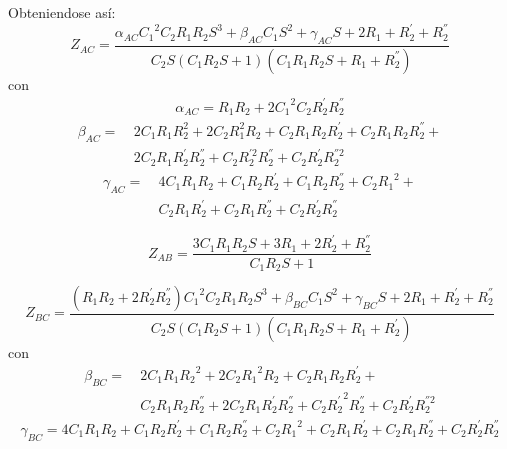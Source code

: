 \documentclass[a4paper]{article}
\begin{document}
Obteniendose así:
\begin{equation*}
	Z_{AC} =  \frac{\alpha_{AC} {C_{1}}^{2} C_2 R_{1} R_{2} S^{3} + \beta_{AC} C_1 S^{2}
		+ \gamma_{AC} S + 2 R_1 + R_{2}^{'} + R_{2}^{''}}{
		 C_2 S \left( C_1 R_{2} S + 1 \right)
		\left(C_1 R_1 R_{2} S + R_1 + R_{2}^{''}\right)}
\end{equation*}
con
\begin{equation*}
\begin{split}
	\alpha_{AC} = R_{1} R_{2} + 2 {C_{1}}^{2} C_2 R_{2}^{'} R_{2}^{''}
\end{split}
\end{equation*}
\begin{equation*}
\begin{split}
	\beta_{AC} =\ & 2 C_{1} R_1 R_{2}^{2} + 2 C_2 R_{1}^{2} R_{2} + C_2 R_1 R_{2} R_{2}^{'} +
		C_2 R_1 R_{2} R_{2}^{''} +\\
		&2 C_2 R_1 R_{2}^{'} R_{2}^{''} +
		C_2 R_{2}^{'2} R_{2}^{''} + C_2 R_{2}^{'} R_{2}^{''2}
\end{split}
\end{equation*}
\begin{equation*}
\begin{split}
	\gamma_{AC} =\ & 4 C_1 R_1 R_{2} + C_1 R_{2} R_{2}^{'} + C_1 R_{2} R_{2}^{''} +
		C_2 {R_{1}}^{2} +\\
		&C_2 R_1 R_{2}^{'} + C_2 R_1 R_{2}^{''} + C_2 R_{2}^{'} R_{2}^{''}
\end{split}
\end{equation*}

\begin{equation*}
	Z_{AB} = \frac{3 C_1 R_1 R_{2} S + 3 R_1 + 2 R_{2}^{'} + R_{2}^{''}}{C_1 R_{2} S + 1}
\end{equation*}

\begin{equation*}
	Z_{BC} =
	\frac{ \left( R_1 R_{2} + 2 R_{2}^{'} R_{2}^{''} \right ){C_{1}}^{2} C_2 R_1 R_{2} S^{3} +
	\beta_{BC} C_1 S^{2} + \gamma_{BC} S + 2 R_1 + R_{2}^{'} + R_{2}^{''}}
	{C_2 S \left(C_1 R_{2} S + 1\right) \left(C_1 R_1 R_{2} S + R_1 + R_{2}^{'} \right)}
\end{equation*}
con
\begin{equation*}
\begin{split}
	\beta_{BC} =\ & 2 C_1 R_1 {R_{2}}^{2} + 2C_2 {R_{1}}^{2} R_{2} + C_2 R_1 R_{2} R_{2}^{'} +\\
	&C_2 R_1 R_{2} R_{2}^{''} + 2 C_2 R_1 R_{2}^{'} R_{2}^{''} + 
	C_2 {R_{2}^{'}}^2 R_{2}^{''} + C_2 R_{2}^{'} R_{2}^{''2}
\end{split}
\end{equation*}
\begin{equation*}
\begin{split}
	\gamma_{BC} =  4 C_1 R_1 R_{2} + C_1 R_{2} R_{2}^{'} + C_1 R_{2} R_{2}^{''} +
	C_2 {R_{1}}^{2} + C_2 R_1 R_{2}^{'} + C_2 R_1 R_{2}^{''} +
	C_2 R_{2}^{'} R_{2}^{''} 
\end{split}
\end{equation*}
\end{document}
